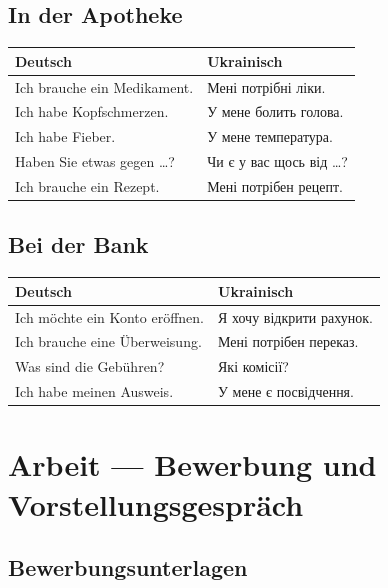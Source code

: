 \documentclass[12pt,twoside,openright]{memoir}
\begin{document}
\section{In der Apotheke}

\begin{lernkasten}
\begin{tabular}{p{5cm} p{5cm}}
\toprule
\textbf{Deutsch} & \textbf{Ukrainisch} \\
\midrule
Ich brauche ein Medikament. & Мені потрібні ліки. \\
Ich habe Kopfschmerzen. & У мене болить голова. \\
Ich habe Fieber. & У мене температура. \\
Haben Sie etwas gegen \ldots? & Чи є у вас щось від \ldots? \\
Ich brauche ein Rezept. & Мені потрібен рецепт. \\
\bottomrule
\end{tabular}
\end{lernkasten}

\section{Bei der Bank}

\begin{lernkasten}
\begin{tabular}{p{5cm} p{5cm}}
\toprule
\textbf{Deutsch} & \textbf{Ukrainisch} \\
\midrule
Ich möchte ein Konto eröffnen. & Я хочу відкрити рахунок. \\
Ich brauche eine Überweisung. & Мені потрібен переказ. \\
Was sind die Gebühren? & Які комісії? \\
Ich habe meinen Ausweis. & У мене є посвідчення. \\
\bottomrule
\end{tabular}
\end{lernkasten}

\chapter{Arbeit — Bewerbung und Vorstellungsgespräch}

\section{Bewerbungsunterlagen}
\end{document}
